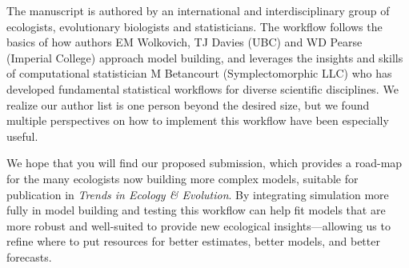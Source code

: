 \documentclass[11pt]{article}
\begin{document}

The manuscript is authored by an international and interdisciplinary group of ecologists, evolutionary biologists and statisticians. The workflow follows the basics of how authors EM Wolkovich, TJ Davies (UBC) and WD Pearse (Imperial College) approach model building, and leverages the insights and skills of computational statistician M Betancourt (Symplectomorphic LLC) who has developed fundamental statistical workflows for diverse scientific disciplines. We realize our author list is one person beyond the desired size, but we found multiple perspectives on how to implement this workflow have been especially useful. %

We hope that you will find our proposed submission, which provides a road-map for the many ecologists now building more complex models, suitable for publication in \emph{Trends in Ecology \& Evolution}. By integrating simulation more fully in model building and testing this workflow can help fit models that are more robust and well-suited to provide new ecological insights---allowing us to refine where to put resources for better estimates, better models, and better forecasts. %
\end{document}
